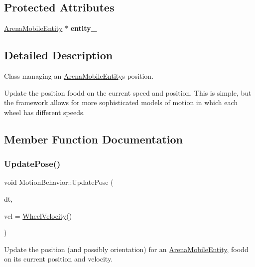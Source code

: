 \subsection*{Protected Attributes}
\begin{DoxyCompactItemize}
\item 
\mbox{\label{class_motion_behavior_a9254cf197657a2a52d89dbc01da31b8f}} 
\mbox{\hyperlink{class_arena_mobile_entity}{Arena\+Mobile\+Entity}} $\ast$ {\bfseries entity\+\_\+}
\end{DoxyCompactItemize}


\subsection{Detailed Description}
Class managing an \mbox{\hyperlink{class_arena_mobile_entity}{Arena\+Mobile\+Entity}}\textquotesingle{}s position. 

Update the position foodd on the current speed and position. This is simple, but the framework allows for more sophisticated models of motion in which each wheel has different speeds. 

\subsection{Member Function Documentation}
\mbox{\label{class_motion_behavior_a804f440bb7f03f19abec79a1ab671494}} 
\subsubsection{\texorpdfstring{Update\+Pose()}{UpdatePose()}}
{\footnotesize\ttfamily void Motion\+Behavior\+::\+Update\+Pose (\begin{DoxyParamCaption}\item[{double}]{dt,  }\item[{\mbox{\hyperlink{struct_wheel_velocity}{Wheel\+Velocity}}}]{vel = {\ttfamily \mbox{\hyperlink{struct_wheel_velocity}{Wheel\+Velocity}}()} }\end{DoxyParamCaption})\hspace{0.3cm}{\ttfamily [virtual]}}



Update the position (and possibly orientation) for an \mbox{\hyperlink{class_arena_mobile_entity}{Arena\+Mobile\+Entity}}, foodd on its current position and velocity. 


